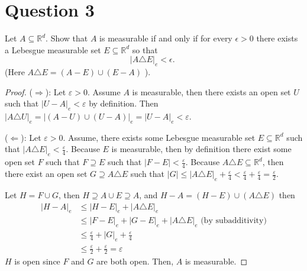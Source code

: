 \section{Question 3}

\begin{question}
    Let $A \subseteq \mathbb{R}^d$. Show that $A$ is measurable if and only if for every $\epsilon>0$ there exists a Lebesgue measurable set $E \subseteq \mathbb{R}^d$ so that
    $$
    |A \triangle E|_e<\epsilon \text {. }
    $$
    (Here $A \triangle E=(A-E) \cup(E-A)$ ).
\end{question}

\begin{answer}
    \begin{proof}
        ($\Rightarrow$): Let $\varepsilon > 0$. Assume $A$ is measurable, then there exists an open set $U$ such that $\lvert U - A\rvert_e < \varepsilon$ by definition. Then $\lvert A \triangle U \rvert_e = \lvert (A - U) \cup (U - A) \lvert_e = \lvert U - A \rvert_e < \varepsilon$.
        
        ($\Leftarrow$): Let $\varepsilon > 0$. Assume, there exists some Lebesgue measurable set $E \subseteq \mathbb{R}^d$ such that $\lvert A \triangle E \rvert_e < \tfrac{\varepsilon}{4}$. Because $E$ is measurable, then by definition there exist some open set $F$ such that $F \supseteq E$ such that $\lvert F - E \rvert < \tfrac{\varepsilon}{4}$. Because $A \triangle E \subseteq \mathbb{R}^d$, then there exist an open set $G \supseteq A \triangle E$ such that $\lvert G \rvert \leq \lvert A \triangle E \rvert_e + \tfrac{\varepsilon}{4} < \tfrac{\varepsilon}{4} + \tfrac{\varepsilon}{4} = \tfrac{\varepsilon}{2}$.
        
        Let $H = F \cup G$, then $H \supseteq A \cup E \supseteq A$, and $H -A = (H - E) \cup (A \triangle E)$ then
        \begin{equation}
            \begin{aligned}
                \lvert H - A \rvert_e & \leq \lvert H - E \rvert_e + \lvert A \triangle E\rvert_e\\
                &\leq \lvert F - E \rvert_e + \lvert G - E \rvert_e + \lvert A \triangle E \rvert_e \text{ (by subadditivity)}\\
                &\leq \tfrac{\varepsilon}{4} + \lvert G \rvert_e + \tfrac{\varepsilon}{4} \\
                &\leq \tfrac{\varepsilon}{2} + \tfrac{\varepsilon}{2} = \varepsilon
            \end{aligned}
        \end{equation}
        $H$ is open since $F$ and $G$ are both open. Then, $A$ is measurable.
    \end{proof}
\end{answer}
